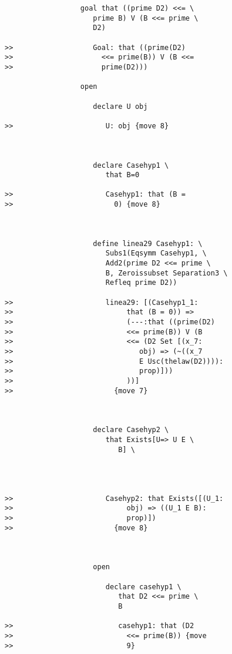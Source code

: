 \documentclass[12pt]{article}
\begin{document}
\begin{verbatim}
                  goal that ((prime D2) <<= \
                     prime B) V (B <<= prime \
                     D2)

>>                   Goal: that ((prime(D2)
>>                     <<= prime(B)) V (B <<=
>>                     prime(D2)))

                  open

                     declare U obj

>>                      U: obj {move 8}



                     declare Casehyp1 \
                        that B=0

>>                      Casehyp1: that (B =
>>                        0) {move 8}



                     define linea29 Casehyp1: \
                        Subs1(Eqsymm Casehyp1, \
                        Add2(prime D2 <<= prime \
                        B, Zeroissubset Separation3 \
                        Refleq prime D2))

>>                      linea29: [(Casehyp1_1:
>>                           that (B = 0)) =>
>>                           (---:that ((prime(D2)
>>                           <<= prime(B)) V (B
>>                           <<= (D2 Set [(x_7:
>>                              obj) => (~((x_7
>>                              E Usc(thelaw(D2)))):
>>                              prop)]))
>>                           ))]
>>                        {move 7}



                     declare Casehyp2 \
                        that Exists[U=> U E \
                           B] \
                        



>>                      Casehyp2: that Exists([(U_1:
>>                           obj) => ((U_1 E B):
>>                           prop)])
>>                        {move 8}



                     open

                        declare casehyp1 \
                           that D2 <<= prime \
                           B

>>                         casehyp1: that (D2
>>                           <<= prime(B)) {move
>>                           9}




\end{verbatim}
\end{document}
